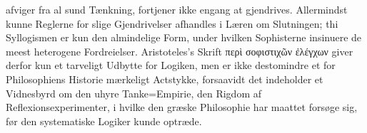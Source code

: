 \documentclass[12pt]{book}
\newcommand{\opage}[1]{\marginnote{\footnotesize\textit{[#1]}}}
\begin{document}
afviger fra al sund Tænkning, fortjener ikke engang at gjendrives. Allermindst
kunne Reglerne for slige Gjendrivelser afhandles i Læren om Slutningen; thi
Syllogismen er kun den almindelige Form, under hvilken
\opage{72} %
Sophisterne insinuere de meest heterogene Fordreielser. Aristoteles's Skrift περὶ
σοφιστιχῶν ἐλέγχων giver derfor kun et tarveligt Udbytte for Logiken, men er ikke
destomindre et for Philosophiens Historie mærkeligt Actstykke, forsaavidt det
indeholder et Vidnesbyrd om den uhyre Tanke=Empirie, den Rigdom af
Reflexionsexperimenter, i hvilke den græske Philosophie har maattet forsøge sig, før
den systematiske Logiker kunde optræde.
\end{document}
